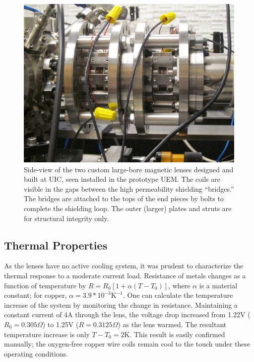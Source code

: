 \begin{figure}
  \centering
  \includegraphics{maglens.jpg}
  \caption[Side-view picture of the employed two custom large-bore magnetic lenses]{
    Side-view of the two custom large-bore magnetic lenses designed and built at UIC, seen installed in the prototype UEM.
    The coils are visible in the gaps between the high permeability shielding ``bridges.''
    The bridges are attached to the tops of the end pieces by bolts to complete the shielding loop.
    The outer (larger) plates and struts are for structural integrity only.
  }
  \label{fig:maglens-pic}
\end{figure}

\subsection{Thermal Properties} \label{sec:mag_lens_thermal}

As the lenses have no active cooling system, it was prudent to characterize the thermal response to a moderate current load.
Resistance of metals changes as a function of temperature by $ R = R_0 [ 1 + \alpha ( T - T_0 ) ] $, where $\alpha$ is a material constant; for copper, $\alpha = 3.9 * 10^{-3} \text{K}^{-1}$. 
One can calculate the temperature increase of the system by monitoring the change in resistance.
Maintaining a constant current of 4A through the lens, the voltage drop increased from 1.22V ($R_0 = 0.305\Omega$) to 1.25V ($R=0.3125\Omega$) as the lens warmed.
The resultant temperature increase is only $T - T_0 = 2\text{K}$.
This result is easily confirmed manually; the oxygen-free copper wire coils remain cool to the touch under these operating conditions.

